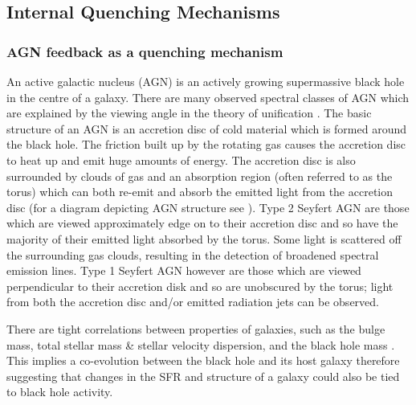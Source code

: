 \subsection{Internal Quenching Mechanisms}\label{sec:intquench}

\subsubsection{AGN feedback as a quenching mechanism}\label{sec:agnquench}

An active galactic nucleus (AGN) is an actively growing supermassive black hole in the centre of a galaxy. There are many observed spectral classes of AGN which are explained by the viewing angle in the theory of unification \citep[see review by][]{netzer15}. The basic structure of an AGN is an accretion disc of cold material which is formed around the black hole. The friction built up by the rotating gas causes the accretion disc to heat up and emit huge amounts of energy. The accretion disc is also surrounded by clouds of gas and an absorption region (often referred to as the torus) which can both re-emit and absorb the emitted light from the accretion disc (for a diagram depicting AGN structure see \citealt{beckmann12}). Type 2 Seyfert AGN are those which are viewed approximately edge on to their accretion disc and so have the majority of their emitted light absorbed by the torus. Some light is scattered off the surrounding gas clouds, resulting in the detection of broadened spectral emission lines. Type 1 Seyfert AGN however are those which are viewed perpendicular to their accretion disk and so are unobscured by the torus; light from both the accretion disc and/or emitted radiation jets can be observed. 


There are tight correlations between properties of galaxies, such as the bulge mass, total stellar mass \& stellar velocity dispersion, and the black hole mass \citep{magorrian98, marconi03, haringrix04}. This implies a co-evolution between the black hole and its host galaxy therefore suggesting that changes in the SFR and structure of a galaxy could also be tied to black hole activity. 

